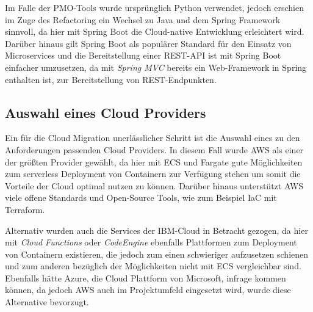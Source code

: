 Im Falle der PMO-Tools wurde ursprünglich Python verwendet, jedoch erschien im Zuge des Refactoring ein Wechsel zu Java und dem \gls{Spring} Framework sinnvoll, da hier mit \gls{Spring Boot} die Cloud-native Entwicklung erleichtert wird. Darüber hinaus gilt \gls{Spring Boot} als populärer Standard für den Einsatz von Microservices und die Bereitstellung einer \ac{REST}-\ac{API} ist mit \gls{Spring Boot} einfacher umzusetzen, da mit \textit{Spring MVC} bereits ein Web-Framework in \gls{Spring} enthalten ist, zur Bereitstellung von \ac{REST}-Endpunkten.

\subsection{Auswahl eines Cloud Providers}
Ein für die Cloud Migration unerlässlicher Schritt ist die Auswahl eines zu den Anforderungen passenden Cloud Providers. In diesem Fall wurde \ac{AWS} als einer der größten Provider \cite[Vgl.][S. 6]{Sustar2022} gewählt, da hier mit \ac{ECS} und \gls{Fargate} gute Möglichkeiten zum serverless Deployment von Containern zur Verfügung stehen um somit die Vorteile der Cloud optimal nutzen zu können. Darüber hinaus unterstützt \ac{AWS} viele offene Standards und Open-Source Tools, wie zum Beispiel \ac{IaC} mit Terraform.

Alternativ wurden auch die Services der IBM-Cloud in Betracht gezogen, da hier mit \textit{Cloud Functions} oder \textit{CodeEngine} ebenfalls Plattformen zum Deployment von Containern existieren, die jedoch zum einen schwieriger aufzusetzen schienen und zum anderen bezüglich der Möglichkeiten nicht mit \ac{ECS} vergleichbar sind. Ebenfalls hätte Azure, die Cloud Plattform von Microsoft, infrage kommen können, da jedoch \ac{AWS} auch im Projektumfeld eingesetzt wird, wurde diese Alternative bevorzugt. \pagebreak